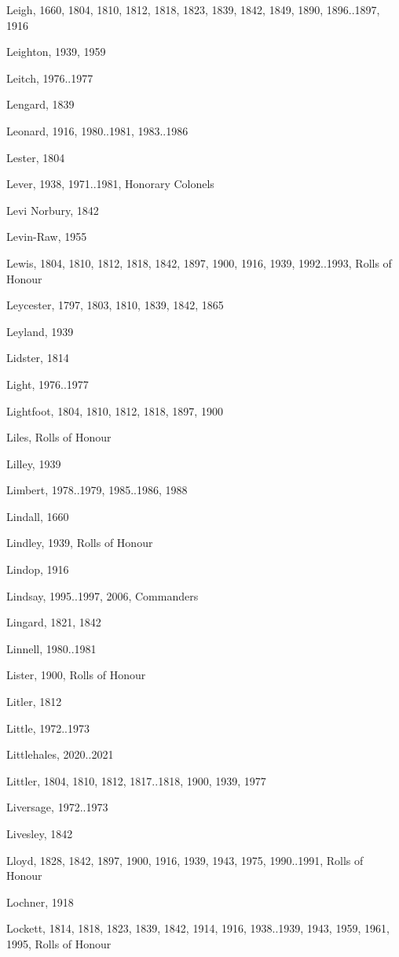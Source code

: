 \begin{theindex}
\item Leigh, 1660, 1804, 1810, 1812, 1818, 1823, 1839, 1842, 1849, 1890, 1896..1897, 1916
\item Leighton, 1939, 1959
\item Leitch, 1976..1977
\item Lengard, 1839
\item Leonard, 1916, 1980..1981, 1983..1986
\item Lester, 1804
\item Lever, 1938, 1971..1981, Honorary Colonels
\item Levi Norbury, 1842
\item Levin-Raw, 1955
\item Lewis, 1804, 1810, 1812, 1818, 1842, 1897, 1900, 1916, 1939, 1992..1993, Rolls of Honour
\item Leycester, 1797, 1803, 1810, 1839, 1842, 1865
\item Leyland, 1939
\item Lidster, 1814
\item Light, 1976..1977
\item Lightfoot, 1804, 1810, 1812, 1818, 1897, 1900
\item Liles, Rolls of Honour
\item Lilley, 1939
\item Limbert, 1978..1979, 1985..1986, 1988
\item Lindall, 1660
\item Lindley, 1939, Rolls of Honour
\item Lindop, 1916
\item Lindsay, 1995..1997, 2006, Commanders
\item Lingard, 1821, 1842
\item Linnell, 1980..1981
\item Lister, 1900, Rolls of Honour
\item Litler, 1812
\item Little, 1972..1973
\item Littlehales, 2020..2021
\item Littler, 1804, 1810, 1812, 1817..1818, 1900, 1939, 1977
\item Liversage, 1972..1973
\item Livesley, 1842
\item Lloyd, 1828, 1842, 1897, 1900, 1916, 1939, 1943, 1975, 1990..1991, Rolls of Honour
\item Lochner, 1918
\item Lockett, 1814, 1818, 1823, 1839, 1842, 1914, 1916, 1938..1939, 1943, 1959, 1961, 1995, Rolls of Honour

\end{theindex}
